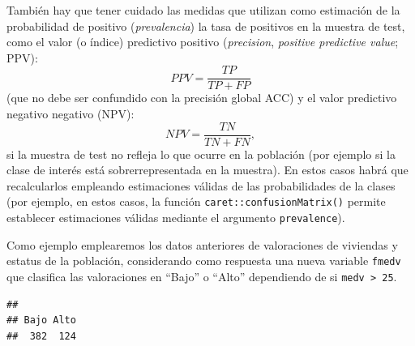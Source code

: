 \documentclass[
]{book}
\newenvironment{Shaded}{\begin{snugshade}}{\end{snugshade}}
\newcommand{\CommentTok}[1]{\textcolor[rgb]{0.56,0.35,0.01}{\textit{#1}}}
\newcommand{\DataTypeTok}[1]{\textcolor[rgb]{0.13,0.29,0.53}{#1}}
\newcommand{\DecValTok}[1]{\textcolor[rgb]{0.00,0.00,0.81}{#1}}
\newcommand{\KeywordTok}[1]{\textcolor[rgb]{0.13,0.29,0.53}{\textbf{#1}}}
\newcommand{\NormalTok}[1]{#1}
\newcommand{\OperatorTok}[1]{\textcolor[rgb]{0.81,0.36,0.00}{\textbf{#1}}}
\newcommand{\OtherTok}[1]{\textcolor[rgb]{0.56,0.35,0.01}{#1}}
\newcommand{\StringTok}[1]{\textcolor[rgb]{0.31,0.60,0.02}{#1}}
\theoremstyle{break}
\theoremstyle{definition}
\theoremstyle{definition}
\theoremstyle{definition}
\theoremstyle{remark}
\begin{document}
También hay que tener cuidado las medidas que utilizan como estimación de la probabilidad de positivo (\emph{prevalencia}) la tasa de positivos en la muestra de test, como el valor (o índice) predictivo positivo (\emph{precision}, \emph{positive predictive value}; PPV):
\[PPV = \frac{TP}{TP+FP}\]
(que no debe ser confundido con la precisión global ACC) y el valor predictivo negativo negativo (NPV):
\[NPV = \frac{TN}{TN+FN},\]
si la muestra de test no refleja lo que ocurre en la población (por ejemplo si la clase de interés está sobrerrepresentada en la muestra).
En estos casos habrá que recalcularlos empleando estimaciones válidas de las probabilidades de la clases (por ejemplo, en estos casos, la función \texttt{caret::confusionMatrix()} permite establecer estimaciones válidas mediante el argumento \texttt{prevalence}).

Como ejemplo emplearemos los datos anteriores de valoraciones de viviendas y estatus de la población, considerando como respuesta una nueva variable \texttt{fmedv} que clasifica las valoraciones en ``Bajo'' o ``Alto'' dependiendo de si \texttt{medv\ \textgreater{}\ 25}.

\begin{Shaded}
\end{Shaded}

\begin{verbatim}
## 
## Bajo Alto 
##  382  124
\end{verbatim}

\begin{Shaded}
\end{Shaded}
\end{document}
